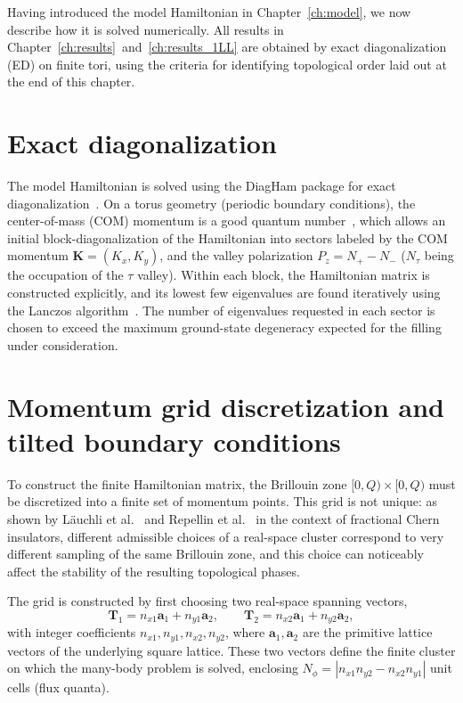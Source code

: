 Having introduced the model Hamiltonian in Chapter~\ref{ch:model}, we now describe how it is solved numerically. All results in Chapter~\ref{ch:results}~and~\ref{ch:results_1LL} are obtained by exact diagonalization (ED) on finite tori, using the criteria for identifying topological order laid out at the end of this chapter.

\section{Exact diagonalization}\label{sec:ed}

The model Hamiltonian is solved using the DiagHam package for exact diagonalization~\cite{DiagHam}. On a torus geometry (periodic boundary conditions), the center-of-mass (COM) momentum is a good quantum number~\cite{bernevig2012emergent}, which allows an initial block-diagonalization of the Hamiltonian into sectors labeled by  the COM momentum $\mathbf{K} = (K_x, K_y)$, and the valley polarization $P_z = N_+ - N_-$ ($N_\tau$ being the occupation of the $\tau$ valley). Within each block, the Hamiltonian matrix is constructed explicitly, and its lowest few eigenvalues are found iteratively using the Lanczos algorithm~\cite{Lanczos1950}. The number of eigenvalues requested in each sector is chosen to exceed the maximum ground-state degeneracy expected for the filling under consideration.

\section{Momentum grid discretization and tilted boundary conditions}\label{sec:tilted_bc}

To construct the finite Hamiltonian matrix, the Brillouin zone $[0, Q) \times [0, Q)$ must be discretized into a finite set of momentum points. This grid is not unique: as shown by L\"auchli et al.~\cite{lauchli2013hierarchy} and Repellin et al.~\cite{repellin2014z} in the context of fractional Chern insulators, different admissible choices of a real-space cluster correspond to very different sampling of the same Brillouin zone, and this choice can noticeably affect the stability of the resulting topological phases.

The grid is constructed by first choosing two real-space spanning vectors,
\begin{equation}
    \mathbf{T}_1 = n_{x1}\mathbf{a}_1 + n_{y1}\mathbf{a}_2, \qquad
    \mathbf{T}_2 = n_{x2}\mathbf{a}_1 + n_{y2}\mathbf{a}_2,
    \label{eq:tilted_vectors}
\end{equation}
with integer coefficients $n_{x1}, n_{y1}, n_{x2}, n_{y2}$, where $\mathbf{a}_1, \mathbf{a}_2$ are the primitive lattice vectors of the underlying square lattice. These two vectors define the finite cluster on which the many-body problem is solved, enclosing $N_\phi = |n_{x1}n_{y2} - n_{x2}n_{y1}|$ unit cells (flux quanta).

